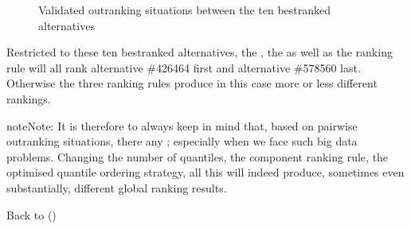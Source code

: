\documentclass[a4paper,10pt,english]{sphinxhowto}
\let\sphinxpxdimen\pdfpxdimen\else\newdimen\sphinxpxdimen
\begin{document}
\begin{figure}[htbp]
\centering
\capstart

\noindent\sphinxincludegraphics[width=400\sphinxpxdimen]{{converse-dual_rel_best10}.png}
\caption{Validated  outranking situations between the ten best\sphinxhyphen{}ranked alternatives}\label{\detokenize{tutorial:converse-dual-rel-best10}}\end{figure}

Restricted to these ten best\sphinxhyphen{}ranked alternatives, the , the  as well as the  ranking rule will all rank alternative \#426464 first and alternative \#578560 last. Otherwise the three ranking rules produce in this case more or less different rankings.

\begin{sphinxVerbatim}[commandchars=\\\{\},numbers=left,firstnumber=1,stepnumber=1]
\end{sphinxVerbatim}

\begin{sphinxadmonition}{note}{Note:}
It is therefore  to always keep in mind that, based on pairwise outranking situations, there  any ; especially when we face such big data problems. Changing the number of quantiles, the component ranking rule, the optimised quantile ordering strategy, all this will indeed produce, sometimes even substantially, different global ranking results.
\end{sphinxadmonition}

Back to {\hyperref[\detokenize{tutorial:tutorial-label}]{}} ()
\end{document}
